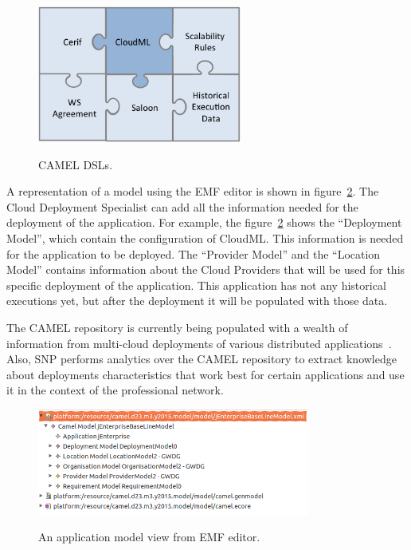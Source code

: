 \begin{figure}[h]
	\caption{CAMEL DSLs.}
	\includegraphics[width=0.6\textwidth,natwidth=200,natheight=150]{./fig/dsl.png}
	\centering
	\label{fig:dsls}
\end{figure}

A representation of a model using the EMF editor is shown in figure~\ref{fig:app_view_emf}. The Cloud Deployment Specialist can add all the information needed for the deployment of the application. For example, the figure~\ref{fig:app_view_emf} shows the ``Deployment Model'', which contain the configuration of CloudML. This information is needed for the application to be deployed. The ``Provider Model'' and the ``Location Model'' contains information about the Cloud Providers that will be used for this specific deployment of the application. This application has not any historical executions yet, but after the deployment it will be populated with those data.
 
The CAMEL repository is currently being populated with a wealth of information from multi-cloud deployments of various distributed applications~\cite{Papaioannou2013}. Also, SNP performs analytics over the CAMEL repository to extract knowledge about deployments characteristics that work best for certain applications and use it in the context of the professional network.

\begin{figure}[h]
	\caption{An application model view from EMF editor.}
	\includegraphics[width=0.8\textwidth,natwidth=200,natheight=150]{./fig/camel_model_example.png}
	\centering
	\label{fig:app_view_emf}
\end{figure}


